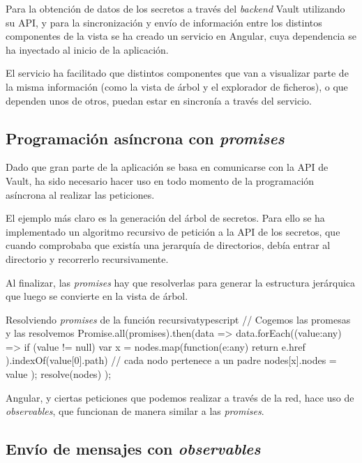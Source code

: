 \documentclass{\ClassPath/viu-tfm-template}
\begin{document}
Para la obtención de datos de los secretos a través del \textit{backend} Vault utilizando su API, y para la sincronización y envío de información entre los distintos componentes de la vista se ha creado un servicio en Angular, cuya dependencia se ha inyectado al inicio de la aplicación.

El servicio ha facilitado que distintos componentes que van a visualizar parte de la misma información (como la vista de árbol y el explorador de ficheros), o que dependen unos de otros, puedan estar en sincronía a través del servicio.


\subsection{Programación asíncrona con \textit{promises}}

Dado que gran parte de la aplicación se basa en comunicarse con la API de Vault, ha sido necesario hacer uso en todo momento de la programación asíncrona al realizar las peticiones.

El ejemplo más claro es la generación del árbol de secretos. Para ello se ha implementado un algoritmo recursivo de petición a la API de los secretos, que cuando comprobaba que existía una jerarquía de directorios, debía entrar al directorio y recorrerlo recursivamente.

Al finalizar, las \textit{promises} hay que resolverlas para generar la estructura jerárquica que luego se convierte en la vista de árbol.

\begin{mycode}{Resolviendo \textit{promises} de la función recursiva}{typescript}{}
// Cogemos las promesas y las resolvemos
Promise.all(promises).then(data => {
    data.forEach((value:any) => {
        if (value != null){
            var x = nodes.map(function(e:any){
                return e.href
            }).indexOf(value[0].path)
            // cada nodo pertenece a un padre
            nodes[x].nodes = value
        }
    });
    resolve(nodes)
});
\end{mycode}

Angular, y ciertas peticiones que podemos realizar a través de la red, hace uso de \textit{observables}, que funcionan de manera similar a las \textit{promises}.


\subsection{Envío de mensajes con \textit{observables}}
\end{document}

